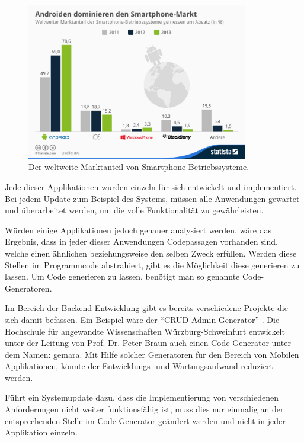 \begin{figure}[H]
	\begin{center}
		\includegraphics[width=0.86\textwidth]{images/os.jpg}
		\caption{Der weltweite Marktanteil von Smartphone-Betriebssysteme. \cite{os}}
		\label{fig:os_fig}
	\end{center}
\end{figure}

Jede dieser Applikationen wurden einzeln für sich entwickelt und implementiert. Bei jedem Update zum Beispiel des Systems, müssen alle Anwendungen gewartet und überarbeitet werden, um die volle Funktionalität zu gewährleisten.

Würden einige Applikationen jedoch genauer analysiert werden, wäre das Ergebnis, dass in jeder dieser Anwendungen Codepassagen vorhanden sind, welche einen ähnlichen beziehungsweise den selben Zweck erfüllen. Werden diese Stellen im Programmcode abstrahiert, gibt es die Möglichkeit diese generieren zu lassen. Um Code generieren zu lassen, benötigt man so genannte Code-Generatoren. 

Im Bereich der Backend-Entwicklung gibt es bereits verschiedene Projekte die sich damit befassen. Ein Beispiel wäre der \enquote{CRUD Admin Generator} \cite{generators}. Die Hochschule für angewandte Wissenschaften Würzburg-Schweinfurt entwickelt  unter der Leitung von Prof. Dr. Peter Braun auch einen Code-Generator unter dem Namen: \ac{gemara}. Mit Hilfe solcher Generatoren für den Bereich von Mobilen Applikationen, könnte der Entwicklungs- und Wartungsaufwand reduziert werden. 

Führt ein Systemupdate dazu, dass die Implementierung von verschiedenen Anforderungen nicht weiter funktionsfähig ist, muss dies nur einmalig an der entsprechenden Stelle im Code-Generator geändert werden und nicht in jeder Applikation einzeln. 

